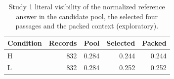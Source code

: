\begin{table}[htbp]\centering\small
\caption{Study 1 literal visibility of the normalized reference answer in the candidate pool, the selected four passages and the packed context (exploratory).}\label{tab:flow1}
\begin{tabular}{lrrrr}\toprule
Condition & Records & Pool & Selected & Packed\\\midrule
H & 832 & 0.284 & 0.244 & 0.244\\
L & 832 & 0.284 & 0.252 & 0.252\\
\bottomrule\end{tabular}\end{table}
